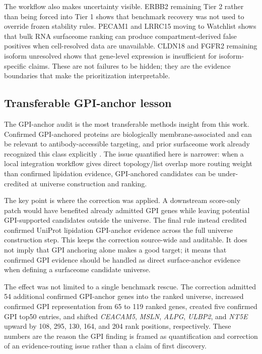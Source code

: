 \documentclass[twocolumn]{article}
\begin{document}
The workflow also makes uncertainty visible. ERBB2 remaining Tier 2 rather than being forced into Tier 1 shows that benchmark recovery was not used to override frozen stability rules. PECAM1 and LRRC15 moving to Watchlist shows that bulk RNA surfaceome ranking can produce compartment-derived false positives when cell-resolved data are unavailable. CLDN18 and FGFR2 remaining isoform unresolved shows that gene-level expression is insufficient for isoform-specific claims. These are not failures to be hidden; they are the evidence boundaries that make the prioritization interpretable.

\subsection{Transferable GPI-anchor lesson}

The GPI-anchor audit is the most transferable methods insight from this work. Confirmed GPI-anchored proteins are biologically membrane-associated and can be relevant to antibody-accessible targeting, and prior surfaceome work already recognized this class explicitly \cite{bauschfluck2018surfy}. The issue quantified here is narrower: when a local integration workflow gives direct topology/\allowbreak{}list overlap more routing weight than confirmed lipidation evidence, GPI-anchored candidates can be under-credited at universe construction and ranking.

The key point is where the correction was applied. A downstream score-only patch would have benefited already admitted GPI genes while leaving potential GPI-supported candidates outside the universe. The final rule instead credited confirmed UniProt lipidation GPI-anchor evidence across the full universe construction step. This keeps the correction source-wide and auditable. It does not imply that GPI anchoring alone makes a good target; it means that confirmed GPI evidence should be handled as direct surface-anchor evidence when defining a surfaceome candidate universe.

The effect was not limited to a single benchmark rescue. The correction admitted 54 additional confirmed GPI-anchor genes into the ranked universe, increased confirmed GPI representation from 65 to 119 ranked genes, created five confirmed GPI top50 entries, and shifted \textit{CEACAM5}, \textit{MSLN}, \textit{ALPG}, \textit{ULBP2}, and \textit{NT5E} upward by 108, 295, 130, 164, and 204 rank positions, respectively. These numbers are the reason the GPI finding is framed as quantification and correction of an evidence-routing issue rather than a claim of first discovery.
\end{document}
